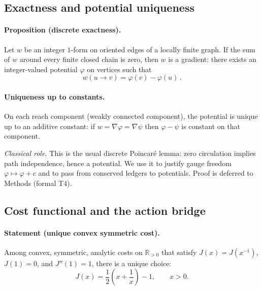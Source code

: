 \documentclass[11pt]{article}
\begin{document}
\subsection{Exactness and potential uniqueness}\label{subsec:exactness}

\paragraph{Proposition (discrete exactness).} Let $w$ be an integer $1$-form on oriented edges of a locally finite graph. If the sum of $w$ around every finite closed chain is zero, then $w$ is a gradient: there exists an integer-valued potential $\varphi$ on vertices such that
\begin{equation}
w(u\!\to\! v) = \varphi(v) - \varphi(u)\,.
\end{equation}

\paragraph{Uniqueness up to constants.} On each reach component (weakly connected component), the potential is unique up to an additive constant: if $w=\nabla\varphi=\nabla\psi$ then $\varphi-\psi$ is constant on that component.

\noindent\emph{Classical role.} This is the usual discrete Poincaré lemma: zero circulation implies path independence, hence a potential. We use it to justify gauge freedom $\varphi\!\mapsto\!\varphi+c$ and to pass from conserved ledgers to potentials. Proof is deferred to Methods (formal T4).

\subsection{Cost functional and the action bridge}\label{subsec:cost-EL}

\paragraph{Statement (unique convex symmetric cost).} Among convex, symmetric, analytic costs on $\mathbb{R}_{>0}$ that satisfy $J(x)=J(x^{-1})$, $J(1)=0$, and $J''(1)=1$, there is a unique choice:
\begin{equation}
J(x) = \frac{1}{2}\left(x+\frac{1}{x}\right) - 1, \qquad x>0.
\end{equation}
\end{document}
